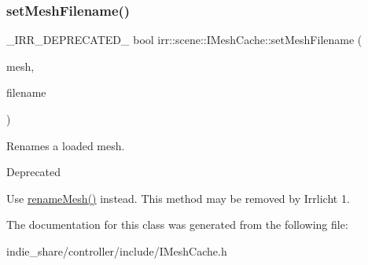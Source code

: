 \subsubsection{\texorpdfstring{set\+Mesh\+Filename()}{setMeshFilename()}\hspace{0.1cm}{\footnotesize\ttfamily [4/4]}}
{\footnotesize\ttfamily \+\_\+\+I\+R\+R\+\_\+\+D\+E\+P\+R\+E\+C\+A\+T\+E\+D\+\_\+ bool irr\+::scene\+::\+I\+Mesh\+Cache\+::set\+Mesh\+Filename (\begin{DoxyParamCaption}\item[{const \hyperlink{classirr_1_1scene_1_1IMesh}{I\+Mesh} $\ast$const}]{mesh,  }\item[{const \hyperlink{namespaceirr_1_1io_a6468281622ce3a1c46b72e19f32dded5}{io\+::path} \&}]{filename }\end{DoxyParamCaption})\hspace{0.3cm}{\ttfamily [inline]}}



Renames a loaded mesh. 

\begin{DoxyRefDesc}{Deprecated}
\item[\hyperlink{deprecated__deprecated000039}{Deprecated}]Use \hyperlink{classirr_1_1scene_1_1IMeshCache_a820743b703cdc4362a3dbe6664271bcb}{rename\+Mesh()} instead. This method may be removed by Irrlicht 1. \end{DoxyRefDesc}


The documentation for this class was generated from the following file\+:\begin{DoxyCompactItemize}
\item 
indie\+\_\+share/controller/include/I\+Mesh\+Cache.\+h\end{DoxyCompactItemize}
